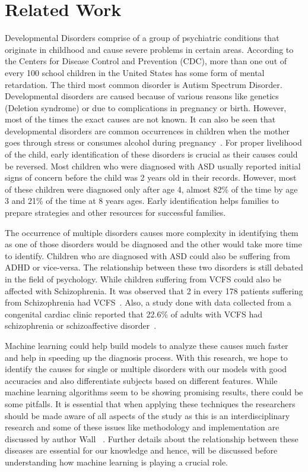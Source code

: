 \linespread{2}
\chapter{Related Work}
\thispagestyle{plainbottom}
Developmental Disorders comprise of a group of psychiatric conditions that originate in childhood and cause severe problems in certain areas. According to the Centers for Disease Control and Prevention (CDC), more than one out of every 100 school children in the United States has some form of mental retardation. The third most common disorder is Autism Spectrum Disorder.
Developmental disorders are caused because of various reasons like genetics (Deletion syndrome) or due to complications in pregnancy or birth. However, most of the times the exact causes are not known. It can also be seen that developmental disorders are common occurrences in children when the mother goes through stress or consumes alcohol during pregnancy~\cite{webpage2}. For proper livelihood of the child, early identification of these disorders is crucial as their causes could be reversed. Most children who were diagnosed with ASD usually reported initial signs of concern before the child was 2 years old in their records. However, most of these children were diagnosed only after age 4, almost 82\% of the time by age 3 and 21\% of the time at 8 years ages\cite{christensen2016prevalence}. Early identification helps families to prepare strategies and other resources for successful families. 

The occurrence of multiple disorders causes more complexity in identifying them as one of those disorders would be diagnosed and the other would take more time to identify. Children who are diagnosed with ASD could also be suffering from ADHD or vice-versa. The relationship between these two disorders is still debated in the field of psychology. While children suffering from VCFS could also be affected with Schizophrenia. It was observed that 2 in every 178 patients suffering from Schizophrenia had VCFS~\cite{bassett199922q11}. Also, a study done with data collected from a congenital cardiac clinic reported that 22.6\% of adults with VCFS had schizophrenia or schizoaffective disorder~\cite{bassett2005clinical}. 

Machine learning could help build models to analyze these causes much faster and help in speeding up the diagnosis process. With this research, we hope to identify the causes for single or multiple disorders with our models with good accuracies and also differentiate subjects based on different features. While machine learning algorithms seem to be showing promising results, there could be some pitfalls. It is essential that when applying these techniques the researchers should be made aware of all aspects of the study as this is an interdisciplinary research and some of these issues like methodology and implementation are discussed by author Wall ~\cite{wall2012use}. Further details about the relationship between these diseases are essential for our knowledge and hence, will be discussed before understanding how machine learning is playing a crucial role.
